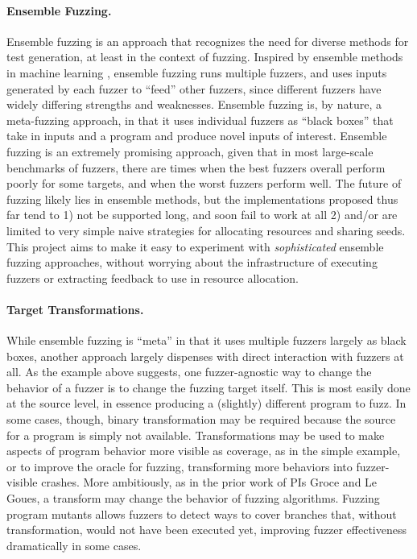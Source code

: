 \paragraph{Ensemble Fuzzing.}   Ensemble fuzzing \cite{chen2019enfuzz} is an 
approach that recognizes the need for
diverse methods for test generation, at least in the context of
fuzzing.   Inspired by ensemble methods in machine learning 
\cite{dietterich2002ensemble},
ensemble fuzzing runs multiple fuzzers, and uses inputs generated by
each fuzzer to ``feed'' other fuzzers, since different fuzzers have widely 
differing strengths and weaknesses. Ensemble fuzzing is, by nature, a 
meta-fuzzing approach, in that it uses individual fuzzers as ``black boxes'' 
that take in inputs and a program and produce novel inputs of interest.  
Ensemble fuzzing is an extremely promising approach, given that in most 
large-scale benchmarks of fuzzers, there are times when the best fuzzers 
overall perform poorly for some targets, and when the worst fuzzers perform 
well.  The future of fuzzing likely lies in ensemble methods, but the 
implementations proposed thus far tend to 1) not be supported long, and soon 
fail to work at all 2) and/or are limited to very simple naive strategies for 
allocating resources and sharing seeds.  This
project aims to make it easy to 
experiment with \emph{sophisticated} ensemble fuzzing approaches, without 
worrying about the infrastructure of executing fuzzers or extracting feedback 
to use in resource allocation.

\paragraph{Target Transformations.}  While ensemble fuzzing is ``meta'' in that 
it uses multiple fuzzers largely as black boxes, another approach largely 
dispenses with direct interaction with fuzzers at all.  As the example above 
suggests, one fuzzer-agnostic way to change the behavior of a fuzzer is to 
change the fuzzing target itself.  This is most easily done at the source 
level, in essence producing a (slightly) different program to fuzz.  In some 
cases, though, binary transformation may be required because the
source for a program is simply not available.   Transformations may be used to make aspects of 
program behavior more visible as coverage, as in the simple example, or to 
improve the oracle for fuzzing, transforming more behaviors into fuzzer-visible 
crashes.  More ambitiously, as in the prior work of PIs Groce and Le Goues, a 
transform may change the behavior of fuzzing algorithms.  Fuzzing program 
mutants allows fuzzers to detect ways to cover branches that, without 
transformation, would not have been executed yet, improving fuzzer 
effectiveness dramatically in some cases.

